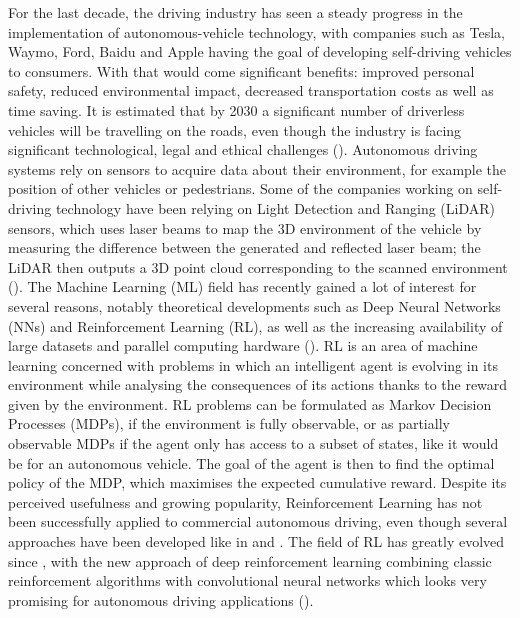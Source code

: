 For the last decade, the driving industry has seen a steady progress in the implementation of autonomous-vehicle technology, with companies such as Tesla, Waymo, Ford, Baidu and Apple having the goal of developing self-driving vehicles to consumers. With that would come significant benefits: improved personal safety, reduced environmental impact, decreased transportation costs as well as time saving. It is estimated that by 2030 a significant number of driverless vehicles will be travelling on the roads, even though the industry is facing significant technological, legal and ethical challenges (\cite{Barab_s_2017}). Autonomous driving systems rely on sensors to acquire data about their environment, for example the position of other vehicles or pedestrians. Some of the companies working on self-driving technology have been relying on Light Detection and Ranging (LiDAR) sensors, which uses laser beams to map the 3D environment of the vehicle by measuring the difference between the generated and reflected laser beam; the LiDAR then outputs a 3D point cloud corresponding to the scanned environment (\cite{lidar}).
	\newline
The Machine Learning (ML) field has recently gained a lot of interest for several reasons, notably theoretical developments such as Deep Neural Networks (NNs) and Reinforcement Learning (RL), as well as the increasing availability of large datasets and parallel computing hardware (\cite{smart}). RL is an area of machine learning concerned with problems in which an intelligent agent is evolving in its environment while analysing the consequences of its actions thanks to the reward given by the environment. RL problems can be formulated as Markov Decision Processes (MDPs), if the environment is fully observable, or as partially observable MDPs if the agent only has access to a subset of states, like it would be for an autonomous vehicle. The goal of the agent is then to find the optimal policy of the MDP, which maximises the expected cumulative reward. Despite its perceived usefulness and growing popularity, Reinforcement Learning has not been successfully applied to commercial autonomous driving, even though several approaches have been developed like in \cite{Reference2} and \cite{Reference3}. The field of RL has greatly evolved since \cite{watkins1989}, with the new approach of deep reinforcement learning combining classic reinforcement algorithms with convolutional neural networks which looks very promising for autonomous driving applications (\cite{Reference4}).
	\newline
